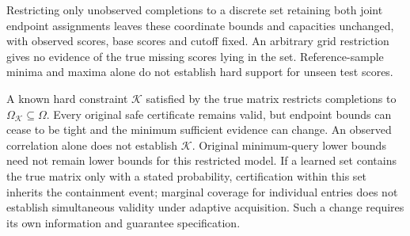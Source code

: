Restricting only unobserved completions to a discrete set retaining both joint endpoint assignments leaves these coordinate bounds and capacities unchanged, with observed scores, base scores and cutoff fixed. An arbitrary grid restriction gives no evidence of the true missing scores lying in the set. Reference-sample minima and maxima alone do not establish hard support for unseen test scores.

A known hard constraint $\mathcal K$ satisfied by the true matrix restricts completions to $\Omega_{\mathcal K}\subseteq\Omega$. Every original safe certificate remains valid, but endpoint bounds can cease to be tight and the minimum sufficient evidence can change. An observed correlation alone does not establish $\mathcal K$. Original minimum-query lower bounds need not remain lower bounds for this restricted model. If a learned set contains the true matrix only with a stated probability, certification within this set inherits the containment event; marginal coverage for individual entries does not establish simultaneous validity under adaptive acquisition. Such a change requires its own information and guarantee specification.

